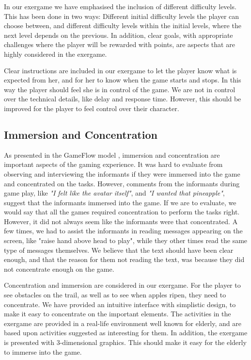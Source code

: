 In our exergame we have emphasised the inclusion of different difficulty levels. This has been done in two ways: Different initial difficulty levels the player can choose between, and different difficulty levels within the initial levels, where the next level depends on the previous. In addition, clear goals, with appropriate challenges where the player will be rewarded with points, are aspects that are highly considered in the exergame.  

Clear instructions are included in our exergame to let the player know what is expected from her, and for her to know when the game starts and stops. In this way the player should feel she is in control of the game. We are not in control over the technical details, like delay and response time. However, this should be improved for the player to feel control over their character.
 
\subsection{Immersion and Concentration}
As presented in the GameFlow model \cite{sweetser}, immersion and concentration are important aspects of the gaming experience. It was hard to evaluate from observing and interviewing the informants if they were immersed into the game and concentrated on the tasks. However, comments from the informants during game play, like \emph{"I felt like the avatar itself"}, and \emph{"I wanted that pineapple"}, suggest that the informants immersed into the game. If we are to evaluate, we would say that all the games required concentration to perform the tasks right. However, it did not always seem like the informants were that concentrated. A few times, we had to assist the informants in reading messages appearing on the screen, like "raise hand above head to play", while they other times read the same type of messages themselves. We believe that the text should have been clear enough, and that the reason for them not reading the text, was because they did not concentrate enough on the game. 

Concentration and immersion are considered in our exergame. For the player to see obstacles on the trail, as well as to see when apples ripen, they need to concentrate. We have provided an intuitive interface with simplistic design, to make it easy to concentrate on the important elements. The activities in the exergame are provided in a real-life environment well known for elderly, and are based upon activities suggested as interesting for them. In addition, the exergame is presented with 3-dimensional graphics. This should make it easy for the elderly to immerse into the game.

